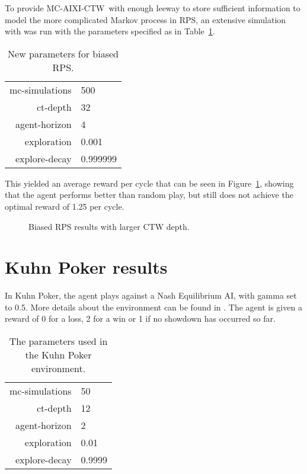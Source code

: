 \documentclass[pdftex,twoside,a4paper]{report}
\newcommand{\mac}{MC-AIXI-CTW}
\begin{document}
To provide \mac\ with enough leeway to store sufficient information to model
the more complicated Markov process in RPS, an extensive simulation with was
run with the parameters specified as in Table~\ref{tab:new_rps_params}.

\begin{table}
\begin{center}
\begin{tabular}{| r | l | }
\hline
mc-simulations & 500\\
ct-depth & 32\\
agent-horizon & 4\\
exploration & 0.001\\
explore-decay & 0.999999\\
\hline
\end{tabular}
\end{center}
\caption{New parameters for biased RPS.}
\label{tab:new_rps_params}
\end{table}

This yielded an average reward per cycle that can be seen in
Figure~\ref{fig:rps_results_ctw}, showing that the agent performs
better than random play, but still does not achieve the optimal reward of 1.25
per cycle.

\begin{figure}[h]
  \begin{center}
  \end{center}
  \caption{Biased RPS results with larger CTW depth.}
  \label{fig:rps_results_ctw}
\end{figure}

\section{Kuhn Poker results}
In Kuhn Poker, the agent plays against a Nash Equilibrium AI, with gamma set to 0.5. More details about the environment can be found in \cite{kuhn}. The agent is given a reward of 0 for a loss, 2 for a win or 1 if no showdown has occurred so far.

\begin{table}[h]
\begin{center}
\begin{tabular}{| r | l | }
\hline
mc-simulations & 50\\
ct-depth & 12\\
agent-horizon & 2\\
exploration & 0.01\\
explore-decay & 0.9999\\
\hline
\end{tabular}
\caption{The parameters used in the Kuhn Poker environment.}
\end{center}
\end{table}
\end{document}
